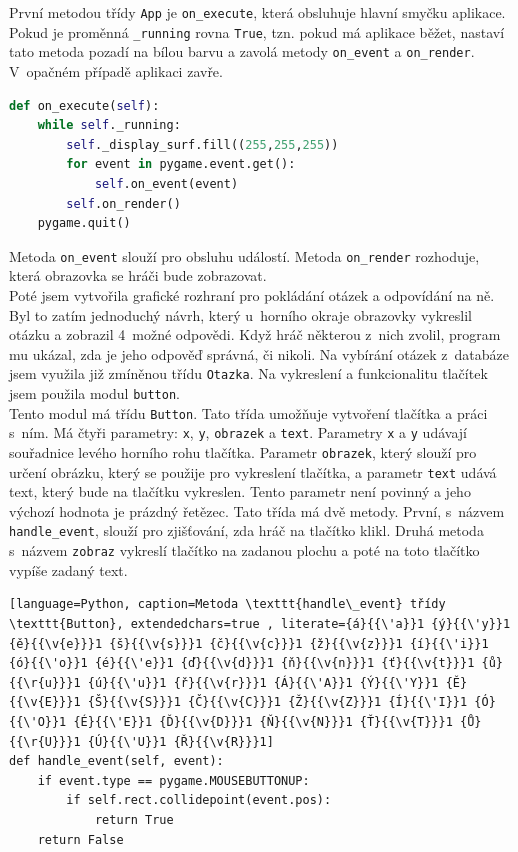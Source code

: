 \documentclass[12pt]{report}
\begin{document}
První metodou třídy \texttt{App} je \texttt{on\_execute}, která obsluhuje hlavní smyčku aplikace. Pokud je proměnná \texttt{\_running} rovna \texttt{True}, tzn. pokud má aplikace běžet, nastaví tato metoda pozadí na bílou barvu a zavolá metody \texttt{on\_event} a \texttt{on\_render}. V~opačném případě aplikaci zavře.
 \begin{lstlisting}[language=Python, caption=Metoda on\_execute]
def on_execute(self):    
    while self._running:
        self._display_surf.fill((255,255,255))
        for event in pygame.event.get():
            self.on_event(event)
        self.on_render()
    pygame.quit()
  \end{lstlisting}
  
Metoda \texttt{on\_event} slouží pro obsluhu událostí. Metoda \texttt{on\_render} rozhoduje, která obrazovka se hráči bude zobrazovat.\\
  
Poté jsem vytvořila grafické rozhraní pro pokládání otázek a odpovídání na ně. Byl to zatím jednoduchý návrh, který u~horního okraje obrazovky vykreslil otázku a zobrazil 4~možné odpovědi. Když hráč některou z~nich zvolil, program mu ukázal, zda je jeho odpověď správná, či nikoli. Na vybírání otázek z~databáze jsem využila již zmíněnou třídu \texttt{Otazka}. Na vykreslení a funkcionalitu tlačítek jsem použila modul \texttt{button}. \\

Tento modul má třídu \texttt{Button}. Tato třída umožňuje vytvoření tlačítka a práci s~ním. Má čtyři parametry: \texttt{x}, \texttt{y}, \texttt{obrazek} a \texttt{text}. Parametry \texttt{x} a \texttt{y} udávají souřadnice levého horního rohu tlačítka. Parametr \texttt{obrazek}, který slouží pro určení obrázku, který se použije pro vykreslení tlačítka, a parametr \texttt{text} udává text, který bude na tlačítku vykreslen. Tento parametr není povinný a jeho výchozí hodnota je prázdný řetězec. Tato třída má dvě metody. První, s~názvem \texttt{handle\_event}, slouží pro zjišťování, zda hráč na tlačítko klikl. Druhá metoda s~názvem \texttt{zobraz} vykreslí tlačítko na zadanou plochu a poté na toto tlačítko vypíše zadaný text.
 \begin{lstlisting}[language=Python, caption=Metoda \texttt{handle\_event} třídy \texttt{Button}, extendedchars=true , literate={á}{{\'a}}1 {ý}{{\'y}}1 {ě}{{\v{e}}}1 {š}{{\v{s}}}1 {č}{{\v{c}}}1 {ž}{{\v{z}}}1 {í}{{\'i}}1 {ó}{{\'o}}1 {é}{{\'e}}1 {ď}{{\v{d}}}1 {ň}{{\v{n}}}1 {ť}{{\v{t}}}1 {ů}{{\r{u}}}1 {ú}{{\'u}}1 {ř}{{\v{r}}}1 {Á}{{\'A}}1 {Ý}{{\'Y}}1 {Ě}{{\v{E}}}1 {Š}{{\v{S}}}1 {Č}{{\v{C}}}1 {Ž}{{\v{Z}}}1 {Í}{{\'I}}1 {Ó}{{\'O}}1 {É}{{\'E}}1 {Ď}{{\v{D}}}1 {Ň}{{\v{N}}}1 {Ť}{{\v{T}}}1 {Ů}{{\r{U}}}1 {Ú}{{\'U}}1 {Ř}{{\v{R}}}1]
def handle_event(self, event):
    if event.type == pygame.MOUSEBUTTONUP:
        if self.rect.collidepoint(event.pos):
            return True
    return False
\end{lstlisting}
\end{document}
